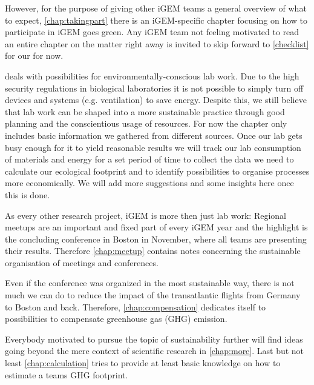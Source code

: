 However, for the purpose of giving other iGEM teams a general overview of what to expect, \cref{chap:takingpart} there is an iGEM-specific chapter focusing on how to participate in iGEM goes green. Any iGEM team not feeling motivated to read an entire chapter on the matter right away is invited to skip forward to \cref{checklist} for our  for now.

 deals with possibilities for environmentally-conscious lab work. Due to the high security regulations in biological laboratories it is not possible to simply turn off devices and systems (e.g. ventilation) to save energy. Despite this, we still believe that lab work can be shaped into a more sustainable practice through good planning and the conscientious usage of resources. For now the chapter only includes basic information we gathered from different sources. Once our lab gets busy enough for it to yield reasonable results we will track our lab consumption of materials and energy for a set period of time to collect the data we need to calculate our ecological footprint and to identify possibilities to organise processes more economically. We will add more suggestions and some insights here once this is done.

As every other research project, iGEM is more then just lab work: Regional meetups are an important and fixed part of every iGEM year and the highlight is the concluding conference in Boston in November, where all teams are presenting their results. Therefore \cref{chap:meetup} contains notes concerning the sustainable organisation of meetings and conferences. 

Even if the conference was organized in the most sustainable way, there is not much we can do to reduce the impact of the transatlantic flights from Germany to Boston and back. Therefore, \cref{chap:compensation} dedicates itself to possibilities to compensate greenhouse gas (GHG) emission.

Everybody motivated to pursue the topic of sustainability further will find ideas going beyond the mere context of scientific research in \cref{chap:more}. Last but not least \cref{chap:calculation} tries to provide at least basic knowledge on how to estimate a teams GHG footprint.
